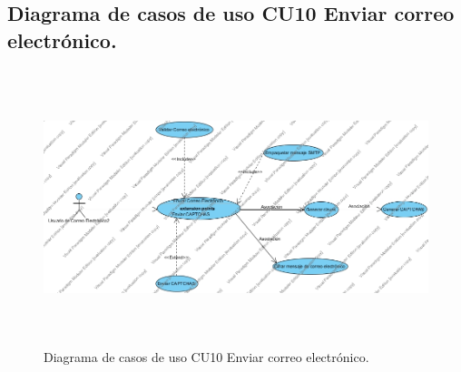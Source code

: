 \documentclass[12pt,oneside,onecolumn,openany]{report}
\begin{document}
\subsection{Diagrama de casos de uso CU10 Enviar correo electrónico.}
\begin{figure}[H]
	\includegraphics[width=1\linewidth, height=8cm]{./images/casodeuso10.jpg}
	\caption{Diagrama de casos de uso CU10 Enviar correo electrónico.}
	\label{fig:4-11-1}
\end{figure}
\end{document}
